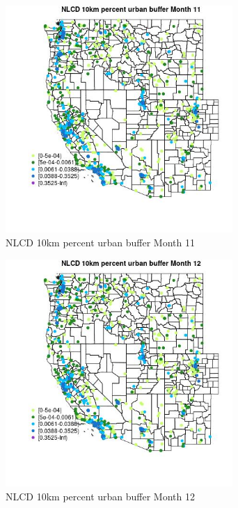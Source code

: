 \begin{figure} 
\centering  
\includegraphics[width=0.77\textwidth]{Code_Outputs/Report_ML_input_PM25_Step4_part_f_de_duplicated_aveswNAs_MapObsMo11NLCD_10km_percent_urban_buffer.jpg} 
\caption{\label{fig:Report_ML_input_PM25_Step4_part_f_de_duplicated_aveswNAsMapObsMo11NLCD_10km_percent_urban_buffer}NLCD 10km percent urban buffer Month 11} 
\end{figure} 
 

\begin{figure} 
\centering  
\includegraphics[width=0.77\textwidth]{Code_Outputs/Report_ML_input_PM25_Step4_part_f_de_duplicated_aveswNAs_MapObsMo12NLCD_10km_percent_urban_buffer.jpg} 
\caption{\label{fig:Report_ML_input_PM25_Step4_part_f_de_duplicated_aveswNAsMapObsMo12NLCD_10km_percent_urban_buffer}NLCD 10km percent urban buffer Month 12} 
\end{figure} 
 

